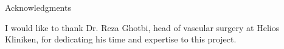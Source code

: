 \thispagestyle{empty}

\vspace*{2cm}

\begin{center}
{ Acknowledgments}
\end{center}

\vspace{1cm}

I would like to thank Dr. Reza Ghotbi, head of vascular surgery at Helios Kliniken, for dedicating his time and expertise to this project. 

\cleardoublepage{}

